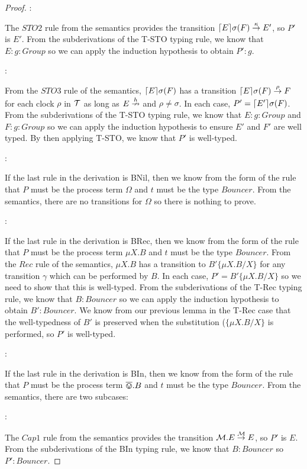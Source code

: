 \begin{proof}
:

\noindent The $STO2$ rule from the semantics provides the transition
$\lceil{E}\rceil {\sigma} ({F}) \stackrel{\kappa}{\rightarrow} E'$, so $P'$ is $E'$.  From
the subderivations of the T-STO typing rule, we know that $E : g :
Group$ so we can apply the induction hypothesis to obtain $P' : g$.

:

\noindent From the $STO3$ rule of the semantics,
$\lceil{E}\rceil {\sigma} ({F})$ has a transition $\lceil{E}\rceil {\sigma} ({F})
\stackrel{\rho}{\rightarrow} F$ for each clock $\rho$ in $\text{$\mathcal{T}$}$ as long as $E
\stackrel{h}{\nrightarrow}$ and $\rho \ne \sigma$.  In each case, $P' =
\lceil{E'}\rceil {\sigma} ({F})$.  From the subderivations of the T-STO
typing rule, we know that $E : g : Group$ and $F : g : Group$ so we
can apply the induction hypothesis to ensure $E'$ and $F'$ are well
typed. By then applying T-STO, we know that $P'$ is well-typed.

:

\noindent If the last rule in the derivation is BNil, then we know
from the form of the rule that $P$ must be the process term $\Omega$
and $t$ must be the type $Bouncer$.  From the semantics, there are no
transitions for $\Omega$ so there is nothing to prove.

:

\noindent If the last rule in the derivation is BRec, then we know
from the form of the rule that $P$ must be the process term $\mu X.B$
and $t$ must be the type $Bouncer$.  From the $Rec$ rule of the
semantics, $\mu X.B$ has a transition to $B'\{\mu X.B/X\}$ for any
transition $\gamma$ which can be performed by $B$.  In each case, $P'
= B'\{\mu X.B/X\}$ so we need to show that this is well-typed.  From
the subderivations of the T-Rec typing rule, we know that $B :
Bouncer$ so we can apply the induction hypothesis to obtain $B' :
Bouncer$.  We know from our previous lemma in the T-Rec case that the
well-typedness of $B'$ is preserved when the substitution ($\{\mu
X.B/X\}$ is performed, so $P'$ is well-typed.

:

\noindent If the last rule in the derivation is BIn, then we know from
the form of the rule that $P$ must be the process term $\overline{\varovee}.B$ and
$t$ must be the type $Bouncer$.  From the semantics, there are two
subcases:

:

\noindent The $Cap1$ rule from the semantics provides the transition
$\text{$\mathcal{M}$}.E \stackrel{\text{$\mathcal{M}$}}{\rightarrow} E$, so $P'$ is $E$.  From the
subderivations of the BIn typing rule, we know that $B : Bouncer$ so
$P' : Bouncer$.


\end{proof}
